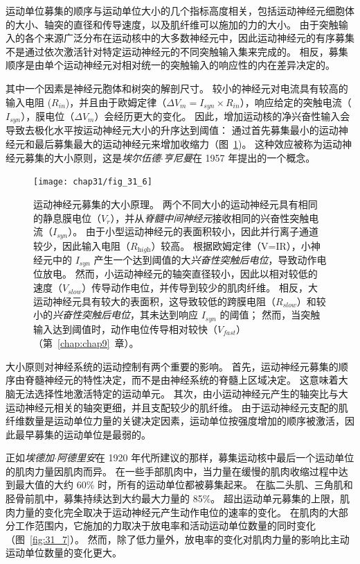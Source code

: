 运动单位募集的顺序与运动单位大小的几个指标高度相关，包括运动神经元细胞体的大小、轴突的直径和传导速度，以及肌纤维可以施加的力的大小。
由于突触输入的各个来源广泛分布在运动核中的大多数神经元中，因此运动神经元的有序募集不是通过依次激活针对特定运动神经元的不同突触输入集来完成的。
相反，募集顺序是由单个运动神经元对相对统一的突触输入的响应性的内在差异决定的。


其中一个因素是神经元胞体和树突的解剖尺寸。
较小的神经元对电流具有较高的输入电阻 ($ R_{in} $)，并且由于欧姆定律（$ \Delta V_m = I_{\textit{syn}} \times R_{in} $），响应给定的突触电流（$ I_{\textit{syn}} $），膜电位（$ \Delta V_m $）会经历更大的变化。
因此，增加运动核的净兴奋性输入会导致去极化水平按运动神经元大小的升序达到阈值：
通过首先募集最小的运动神经元和最后募集最大的运动神经元来增加收缩力（图~\ref{fig:31_6})。
这种效应被称为运动神经元募集的大小原则，这是\textit{埃尔伍德$\cdot$亨尼曼}在 1957 年提出的一个概念。


\begin{figure}[htbp]
	\centering
	\texttt{[image: chap31/fig\_31\_6]}
	\caption{运动神经元募集的大小原理。
	两个不同大小的运动神经元具有相同的静息膜电位（$ V_r $），并从\textit{脊髓中间神经元}接收相同的兴奋性突触电流（$ I_{\textit{syn}} $）。
	由于小型运动神经元的表面积较小，因此并行离子通道较少，因此输入电阻（$ R_{\textit{high}} $）较高。
	根据欧姆定律（V=IR），小神经元中的 $ I_{\textit{syn}} $ 产生一个达到阈值的大\textit{兴奋性突触后电位}，导致动作电位放电。
	然而，小运动神经元的轴突直径较小，因此以相对较低的速度（$ V_{\textit{slow}} $）传导动作电位，并传导到较少的肌肉纤维。
	相反，大运动神经元具有较大的表面积，这导致较低的跨膜电阻（$R_{\textit{slow}}$）和较小的\textit{兴奋性突触后电位}，其未达到响应 $ I_{\textit{syn}} $ 的阈值；
	然而，当突触输入达到阈值时，动作电位传导相对较快（$ V_{\textit{fast}} $）（第~\ref{chap:chap9}~章）。}
	\label{fig:31_6}
\end{figure}


大小原则对神经系统的运动控制有两个重要的影响。
首先，运动神经元募集的顺序由脊髓神经元的特性决定，而不是由神经系统的脊髓上区域决定。
这意味着大脑无法选择性地激活特定的运动单元。
其次，由小运动神经元产生的轴突比与大运动神经元相关的轴突更细，并且支配较少的肌纤维。
由于运动神经元支配的肌纤维数量是运动单位力量的关键决定因素，运动单位按强度增加的顺序被激活，因此最早募集的运动单位是最弱的。


正如\textit{埃德加$\cdot$阿德里安}在 1920 年代所建议的那样，募集运动核中最后一个运动单位的肌肉力量因肌肉而异。
在一些手部肌肉中，当力量在缓慢的肌肉收缩过程中达到最大值的大约 60\% 时，所有的运动单位都被募集起来。
在肱二头肌、三角肌和胫骨前肌中，募集持续达到大约最大力量的 85\%。
超出运动单元募集的上限，肌肉力量的变化完全取决于运动神经元产生动作电位的速率的变化。
在肌肉的大部分工作范围内，它施加的力取决于放电率和活动运动单位数量的同时变化（图~\ref{fig:31_7}）。
然而，除了低力量外，放电率的变化对肌肉力量的影响比主动运动单位数量的变化更大。


